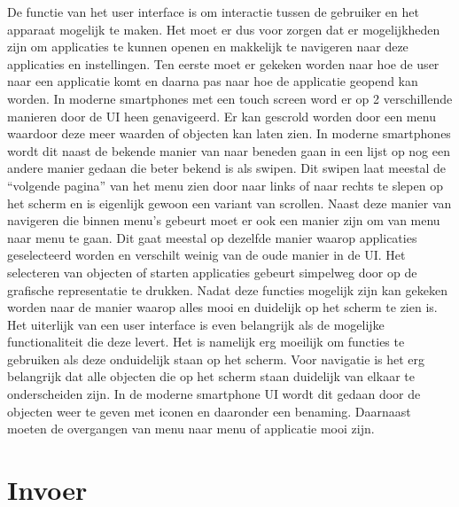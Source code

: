 De functie van het user interface is om interactie tussen de gebruiker en het apparaat mogelijk te maken. Het moet er dus voor zorgen dat er mogelijkheden zijn om applicaties te kunnen openen en makkelijk te navigeren naar deze applicaties en instellingen. Ten eerste moet er gekeken worden naar hoe de user naar een applicatie komt en daarna pas naar hoe de applicatie geopend kan worden. In moderne smartphones met een touch screen word er op 2 verschillende manieren door de UI heen genavigeerd. Er kan gescrold worden door een menu waardoor deze meer waarden of objecten kan laten zien. In moderne smartphones wordt dit naast de bekende manier van naar beneden gaan in een lijst op nog een andere manier gedaan die beter bekend is als swipen. Dit swipen laat meestal de ``volgende pagina'' van het menu zien door naar links of naar rechts te slepen op het scherm en is eigenlijk gewoon een variant van scrollen. Naast deze manier van navigeren die binnen menu’s gebeurt moet er ook een manier zijn om van menu naar menu te gaan. Dit gaat meestal op dezelfde manier waarop applicaties geselecteerd worden en verschilt weinig van de oude manier in de UI. Het selecteren van objecten of starten applicaties gebeurt simpelweg door op de grafische representatie te drukken. Nadat deze functies mogelijk zijn kan gekeken worden naar de manier waarop alles mooi en duidelijk op het scherm te zien is. Het uiterlijk van een user interface is even belangrijk als de mogelijke functionaliteit die deze levert. Het is namelijk erg moeilijk om functies te gebruiken als deze onduidelijk staan op het scherm. Voor navigatie is het erg belangrijk dat alle objecten die op het scherm staan duidelijk van elkaar te onderscheiden zijn. In de moderne smartphone UI wordt dit gedaan door de objecten weer te geven met iconen en daaronder een benaming. Daarnaast moeten de overgangen van menu naar menu of applicatie mooi zijn. 

\section{Invoer}


